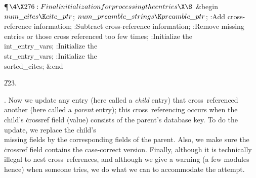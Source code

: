 \Y\P$\4\X276:Final initialization for processing the entries\X\S$\6
\&{begin} $\\{num\_cites}\K\\{cite\_ptr}$;\6
$\\{num\_preamble\_strings}\K\\{preamble\_ptr}$;\6
:Add cross-reference information\X;\6
:Subtract cross-reference information\X;\6
:Remove missing entries or those cross referenced too few times\X;\6
:Initialize the \\{int\_entry\_var}s\X;\6
:Initialize the \\{str\_entry\_var}s\X;\6
:Initialize the \\{sorted\_cites}\X;\6
\&{end}\par
\U223.\fi

.
Now we update any entry (here called a {\it child\/} entry) that
cross~referenced another (here called a {\it parent\/} entry); this
cross~referencing occurs when the child's \.{crossref} field (value)
consists of the parent's database key.  To do the update, we replace
the child's \\{missing} fields by the corresponding fields of the
parent.  Also, we make sure the \.{crossref} field contains the
case-correct version.  Finally, although it is technically illegal to
nest cross~references, and although we give a warning (a few modules
hence) when someone tries, we do what we can to accommodate the
attempt.

